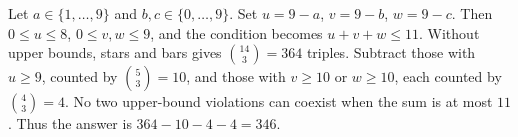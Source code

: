 Let $a\in\{1,\ldots,9\}$ and $b,c\in\{0,\ldots,9\}$. Set $u=9-a$, $v=9-b$, $w=9-c$. Then $0\le u\le8$, $0\le v,w\le9$, and the condition becomes $u+v+w\le11$. Without upper bounds, stars and bars gives $\binom{14}{3}=364$ triples. Subtract those with $u\ge9$, counted by $\binom53=10$, and those with $v\ge10$ or $w\ge10$, each counted by $\binom43=4$. No two upper-bound violations can coexist when the sum is at most $11$. Thus the answer is $364-10-4-4=\boxed{346}$.
